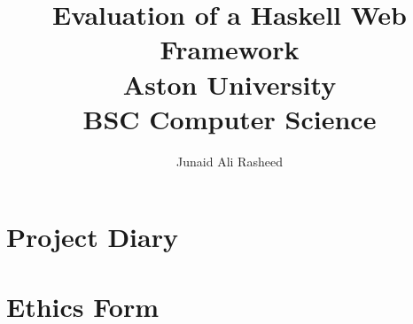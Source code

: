 \documentclass[a4paper,11pt,abstract=on,thesis,twoside]{report}
\title{
	{Evaluation of a Haskell Web Framework}\\
	{\large Aston University}\\
	{\large BSC Computer Science}
}
\author{Junaid Ali Rasheed}
\begin{document}


\maketitle



\tableofcontents
\listoffigures
\lstlistoflistings

\begin{abstract}
\lipsum[1-3]
\end{abstract}









\printbibliography[heading=bibintoc,title={References}]

\begin{refsection}
\nocite{*}
\printbibliography[heading=bibintoc,title={Bibliography}]  
\end{refsection}

\begin{appendices}


	
\chapter{Project Diary}


\chapter{Ethics Form}



\end{appendices}
\end{document}

